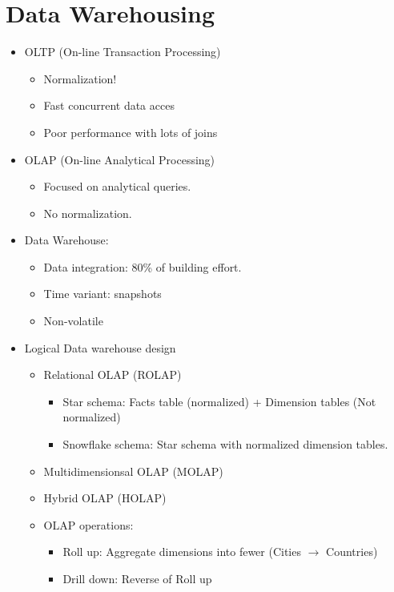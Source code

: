 \documentclass[]{report}
\begin{document}
  \section{Data Warehousing}
    \begin{itemize}
      \item OLTP (On-line Transaction Processing)
      \begin{itemize}
        \item Normalization!
        \item Fast concurrent data acces
        \item Poor performance with lots of joins
      \end{itemize}
      \item OLAP (On-line Analytical Processing)
      \begin{itemize}
        \item Focused on analytical queries.
        \item No normalization.
      \end{itemize}
      \item Data Warehouse:
      \begin{itemize}
        \item Data integration: 80\% of building effort.
        \item Time variant: snapshots
        \item Non-volatile
      \end{itemize}
      \item Logical Data warehouse design
      \begin{itemize}
        \item Relational OLAP (ROLAP)
        \begin{itemize}
          \item Star schema: Facts table (normalized) + Dimension tables (Not normalized)
          \item Snowflake schema: Star schema with normalized dimension tables.
        \end{itemize}
        \item Multidimensionsal OLAP (MOLAP)
        \item Hybrid OLAP (HOLAP)
        \item OLAP operations:
        \begin{itemize}
          \item Roll up: Aggregate dimensions into fewer (Cities $\rightarrow$ Countries)
          \item Drill down: Reverse of Roll up

\end{itemize}
\end{itemize}
\end{itemize}
\end{document}
